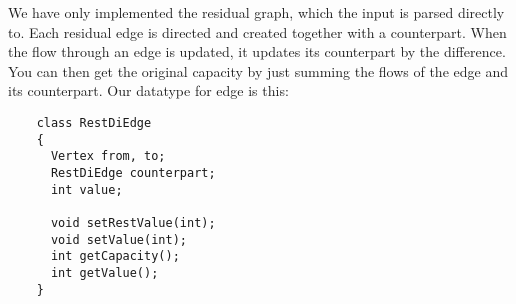 \documentclass{tufte-handout}
\begin{document}
  We have only implemented the residual graph, which the input is parsed directly to. Each residual edge is directed and created together with a counterpart. When the flow through an edge is updated, it updates its counterpart by the difference. You can then get the original capacity by just summing the flows of the edge and its counterpart.
  Our datatype for edge is this:
  \begin{verbatim}
    class RestDiEdge
    {
      Vertex from, to;
      RestDiEdge counterpart;
      int value;
      
      void setRestValue(int);
      void setValue(int);
      int getCapacity();
      int getValue(); 
    }
  \end{verbatim}


\end{document}
